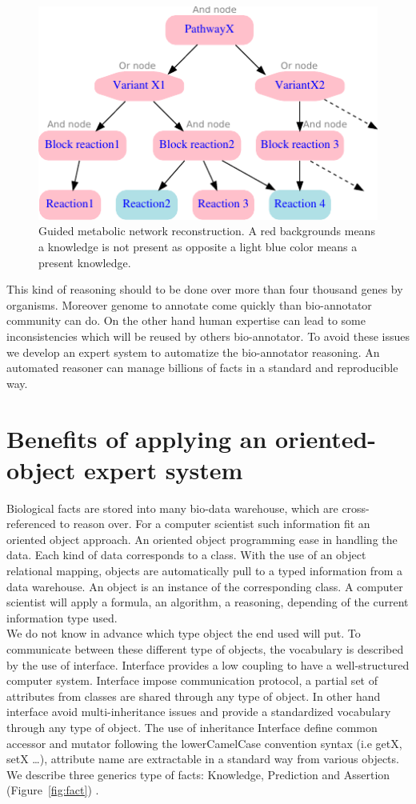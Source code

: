 \documentclass{llncs}
\begin{document}
\begin{figure}[H]
    \centering
    \includegraphics{img/pathway.pdf}
    \caption{Guided metabolic network reconstruction. A red backgrounds means a knowledge is not present as opposite a light blue color means a present knowledge. }
    \label{fig:metabolicNetworkReconstruction}
\end{figure}

This kind of reasoning should to be done over more than four thousand genes by organisms. Moreover genome to annotate come quickly than bio-annotator community can do. On the other hand human expertise can lead to some inconsistencies which will be reused by others bio-annotator. To avoid these issues we develop an expert system to automatize the bio-annotator reasoning. An automated reasoner can manage billions of facts in a standard and reproducible way.

\section{Benefits of applying an oriented-object expert system}
Biological facts are stored into many bio-data warehouse, which are cross-referenced to reason over. For a computer scientist such information fit an oriented object approach. An oriented object programming ease in handling the data. Each kind of data corresponds to a class. With the use of an object relational mapping, objects are automatically pull to a typed information from a data warehouse. An object is an instance of the corresponding class. A computer scientist will apply a formula, an algorithm, a reasoning, depending of the current information type used. \\
We do not know in advance which type object the end used will put. To communicate between these different type of objects, the vocabulary is described by the use of interface. Interface provides a low coupling to have a well-structured computer system. Interface impose communication protocol, a partial set of attributes from classes are shared through any type of object. In other hand interface avoid multi-inheritance issues and provide a standardized vocabulary through any type of object. The use of inheritance Interface define common accessor and mutator following the lowerCamelCase convention syntax (i.e getX, setX \dots), attribute name are extractable in a standard way from various objects. We describe three generics type of facts: Knowledge, Prediction and Assertion (Figure~\ref{fig:fact}) .
\end{document}
